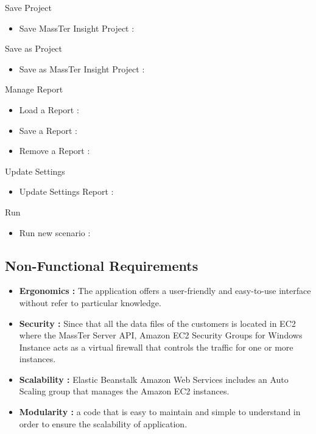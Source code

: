 	Save Project
	\begin{itemize}
		\setlength{\itemindent}{+.5in}
		\item Save MassTer Insight Project :
	\end{itemize}

	Save as Project
	\begin{itemize}
		\setlength{\itemindent}{+.5in}
		\item Save as MassTer Insight Project : 
	\end{itemize}


	
 
 	Manage Report
 		\begin{itemize}
 			\setlength{\itemindent}{+.5in}
 			\item Load a Report : 
 			\item Save a Report : 
 			\item Remove a Report :
 	\end{itemize}
 
  	Update Settings
    \begin{itemize}
    	\setlength{\itemindent}{+.5in}
    	\item Update Settings Report :
   \end{itemize}

  	Run
   \begin{itemize}
   	   \setlength{\itemindent}{+.5in}
 	   \item Run new scenario :
   \end{itemize}

    \clearpage
    \newpage

	\subsection{Non-Functional Requirements}
	\begin{itemize}
		\item \textbf{Ergonomics : }The application offers a user-friendly and easy-to-use interface without refer to particular knowledge.
		\item \textbf{Security : } Since that all the data files of the customers is located in EC2 where the MassTer Server API, Amazon EC2 Security Groups for Windows Instance acts as a virtual firewall that controls the traffic for one or more instances.
		\item \textbf{Scalability : }Elastic Beanstalk Amazon Web Services includes an Auto Scaling group that manages the Amazon EC2 instances.
		\item \textbf{Modularity : }a code that is easy to maintain and simple to understand in order to ensure the scalability of application. 
	\end{itemize}
	\clearpage
	\newpage
	
